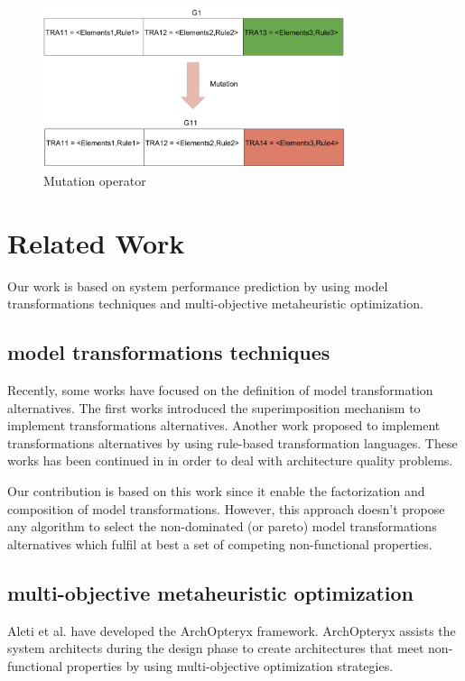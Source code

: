 \documentclass[conference]{IEEEtran}
\begin{document}
\begin{figure}[!t]
\centering
\includegraphics[width=3.49in]{mutation.pdf}
\caption{Mutation operator}
\label{mutation}
\end{figure}

\section{Related Work}
\label{Related}
Our work is based on system performance prediction\cite{1291833} by using model transformations techniques and multi-objective metaheuristic optimization\cite{Coello98acomprehensive}.

\subsection{model transformations techniques}
Recently, some works have focused on the definition of model transformation alternatives. The first works introduced the superimposition mechanism\cite{Navarro:2011:UMT:2041790.2041840} to implement transformations alternatives. Another work\cite{Kavimandan:2011:MQS:2000259.2000264} proposed to implement transformations alternatives by using rule-based transformation languages. These works has been continued in\cite{Drago:2011} in order to deal with architecture quality problems. 

Our contribution is based on this work since it enable the factorization and composition of model transformations. However, this approach doesn't propose any algorithm to select the non-dominated (or pareto) model transformations alternatives which fulfil at best a set of competing non-functional properties.

\subsection{multi-objective metaheuristic optimization}
Aleti et al.\cite{Gr5069138} have developed the ArchOpteryx framework. ArchOpteryx assists the system architects during the design phase to create architectures that meet non-functional properties by using multi-objective optimization strategies. 
\end{document}
